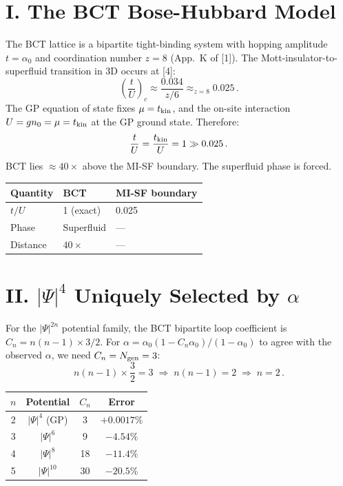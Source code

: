 \documentclass[10pt,twocolumn]{article}
\begin{document}
\section{I.\; The BCT Bose-Hubbard Model}

The BCT lattice is a bipartite tight-binding system with hopping amplitude $t = \alpha_0$ and
coordination number $z = 8$ (App.~K of [1]). The Mott-insulator-to-superfluid transition in 3D
occurs at [4]:
\begin{equation}
\left(\frac{t}{U}\right)_c \approx \frac{0.034}{z/6} \approx_{z=8} 0.025\,.
\label{eq:MISFcrit}
\end{equation}
The GP equation of state fixes $\mu = t_{\rm kin}$, and the on-site interaction
$U = gn_0 = \mu = t_{\rm kin}$ at the GP ground state. Therefore:
\begin{equation}
\frac{t}{U} = \frac{t_{\rm kin}}{U} = 1 \gg 0.025\,.
\label{eq:tU}
\end{equation}
BCT lies $\approx 40\times$ above the MI-SF boundary. The superfluid phase is forced.

\begin{table}[h]
\centering\small
\begin{tabular}{@{}lll@{}}
\toprule
Quantity & BCT & MI-SF boundary \\
\midrule
$t/U$ & 1 (exact) & 0.025 \\
Phase & Superfluid & --- \\
Distance & $40\times$ & --- \\
\bottomrule
\end{tabular}
\end{table}

\section{II.\; $|\Psi|^4$ Uniquely Selected by $\alpha$}

For the $|\Psi|^{2n}$ potential family, the BCT bipartite loop coefficient is
$C_n = n(n-1)\times 3/2$. For $\alpha = \alpha_0(1 - C_n\alpha_0)/(1 - \alpha_0)$ to agree
with the observed $\alpha$, we need $C_n = N_{\rm gen} = 3$:
\begin{equation}
n(n-1)\times\frac{3}{2} = 3
  \;\Longrightarrow\; n(n-1) = 2
  \;\Longrightarrow\; n = 2\,.
\label{eq:nselect}
\end{equation}

\begin{table}[h]
\centering\small
\begin{tabular}{@{}cccc@{}}
\toprule
$n$ & Potential & $C_n$ & Error \\
\midrule
2 & $|\Psi|^4$ (GP) & 3  & $+0.0017\%$ \\
3 & $|\Psi|^6$      & 9  & $-4.54\%$   \\
4 & $|\Psi|^8$      & 18 & $-11.4\%$   \\
5 & $|\Psi|^{10}$   & 30 & $-20.5\%$   \\
\bottomrule
\end{tabular}
\end{table}
\end{document}
